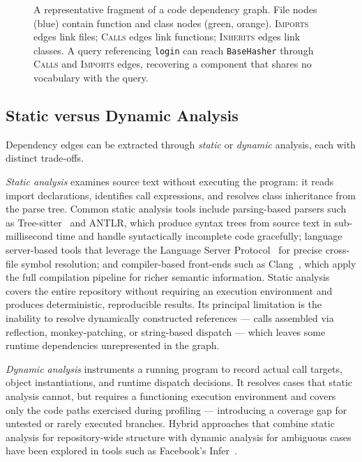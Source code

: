 \begin{figure}[htbp]
\begin{tikzpicture}
    \end{tikzpicture}
    \caption{A representative fragment of a code dependency graph.
        File nodes (blue) contain function and class nodes (green, orange).
        \textsc{Imports} edges link files; \textsc{Calls} edges link functions;
        \textsc{Inherits} edges link classes.
        A query referencing \texttt{login} can reach \texttt{BaseHasher}
        through \textsc{Calls} and \textsc{Imports} edges,
        recovering a component that shares no vocabulary with the query.}
    \label{fig:code-graph-example}
\end{figure}

\subsection{Static versus Dynamic Analysis}
\label{sec:static-dynamic}

Dependency edges can be extracted through \emph{static} or \emph{dynamic} analysis,
each with distinct trade-offs.

\emph{Static analysis} examines source text without executing the program: it reads
import declarations, identifies call expressions, and resolves class inheritance from
the parse tree.
Common static analysis tools include parsing-based parsers such as Tree-sitter~\cite{treesitter}
and ANTLR, which produce syntax trees from source text in sub-millisecond time and
handle syntactically incomplete code gracefully; language server-based tools that leverage
the Language Server Protocol~\cite{lsp} for precise cross-file symbol resolution; and
compiler-based front-ends such as Clang~\cite{clang}, which apply the full compilation
pipeline for richer semantic information.
Static analysis covers the entire repository without requiring an execution environment
and produces deterministic, reproducible results.
Its principal limitation is the inability to resolve dynamically constructed references —
calls assembled via reflection, monkey-patching, or string-based dispatch — which leaves
some runtime dependencies unrepresented in the graph.

\emph{Dynamic analysis} instruments a running program to record actual call targets,
object instantiations, and runtime dispatch decisions.
It resolves cases that static analysis cannot, but requires a functioning execution
environment and covers only the code paths exercised during profiling — introducing
a coverage gap for untested or rarely executed branches.
Hybrid approaches that combine static analysis for repository-wide structure with
dynamic analysis for ambiguous cases have been explored in tools such as Facebook's
Infer~\cite{calcagno2015infer}.

